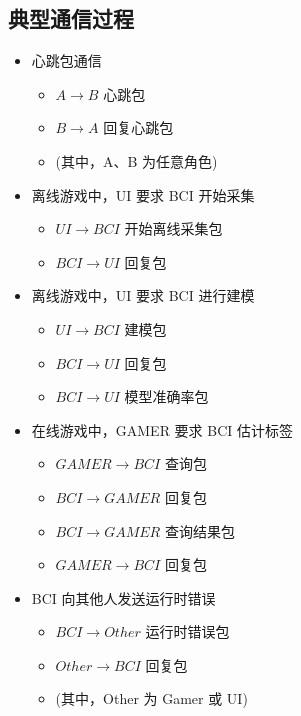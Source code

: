 \documentclass[UTF8]{article}
\begin{document}
\subsection{典型通信过程}

\begin{itemize}
    \item 心跳包通信
          \begin{itemize}
              \item $A \rightarrow B$ 心跳包
              \item $B \rightarrow A$ 回复心跳包
              \item (其中，A、B 为任意角色)
          \end{itemize}

    \item 离线游戏中，UI 要求 BCI 开始采集
          \begin{itemize}
              \item $UI \rightarrow BCI$ 开始离线采集包
              \item $BCI \rightarrow UI$ 回复包
          \end{itemize}

    \item 离线游戏中，UI 要求 BCI 进行建模
          \begin{itemize}
              \item $UI \rightarrow BCI$ 建模包
              \item $BCI \rightarrow UI$ 回复包
              \item $BCI \rightarrow UI$ 模型准确率包
          \end{itemize}

    \item 在线游戏中，GAMER 要求 BCI 估计标签
          \begin{itemize}
              \item $GAMER \rightarrow BCI$ 查询包
              \item $BCI \rightarrow GAMER$ 回复包
              \item $BCI \rightarrow GAMER$ 查询结果包
              \item $GAMER \rightarrow BCI$ 回复包
          \end{itemize}

    \item BCI 向其他人发送运行时错误
          \begin{itemize}
              \item $BCI \rightarrow Other$ 运行时错误包
              \item $Other \rightarrow BCI$ 回复包
              \item (其中，Other 为 Gamer 或 UI)
          \end{itemize}

\end{itemize}
\end{document}
